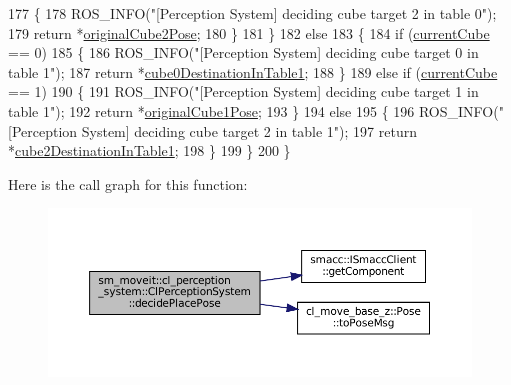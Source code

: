 \begin{DoxyCode}
177             \{
178                 ROS\_INFO(\textcolor{stringliteral}{"[Perception System] deciding cube target 2 in table 0"});
179                 \textcolor{keywordflow}{return} *\hyperlink{classsm__moveit_1_1cl__perception__system_1_1ClPerceptionSystem_a7d8cdfe20da5b47871adf9d3dce11338}{originalCube2Pose};
180             \}
181         \}
182         \textcolor{keywordflow}{else}
183         \{
184             \textcolor{keywordflow}{if} (\hyperlink{classsm__moveit_1_1cl__perception__system_1_1ClPerceptionSystem_a0ffeadfa41480c9d4d0fcc509237dff6}{currentCube} == 0)
185             \{
186                 ROS\_INFO(\textcolor{stringliteral}{"[Perception System] deciding cube target 0 in table 1"});
187                 \textcolor{keywordflow}{return} *\hyperlink{classsm__moveit_1_1cl__perception__system_1_1ClPerceptionSystem_ab84bbc2d5e5a7ef7839a0ade56942679}{cube0DestinationInTable1};
188             \}
189             \textcolor{keywordflow}{else} \textcolor{keywordflow}{if} (\hyperlink{classsm__moveit_1_1cl__perception__system_1_1ClPerceptionSystem_a0ffeadfa41480c9d4d0fcc509237dff6}{currentCube} == 1)
190             \{
191                 ROS\_INFO(\textcolor{stringliteral}{"[Perception System] deciding cube target 1 in table 1"});
192                 \textcolor{keywordflow}{return} *\hyperlink{classsm__moveit_1_1cl__perception__system_1_1ClPerceptionSystem_ab8851b53535efa7e154248c119e8c3cd}{originalCube1Pose};
193             \}
194             \textcolor{keywordflow}{else}
195             \{
196                 ROS\_INFO(\textcolor{stringliteral}{"[Perception System] deciding cube target 2 in table 1"});
197                 \textcolor{keywordflow}{return} *\hyperlink{classsm__moveit_1_1cl__perception__system_1_1ClPerceptionSystem_abb792620853ba381aa0736b884dabe92}{cube2DestinationInTable1};
198             \}
199         \}
200     \}
\end{DoxyCode}
Here is the call graph for this function\+:
\nopagebreak
\begin{figure}[H]
\begin{center}
\leavevmode
\includegraphics[width=350pt]{classsm__moveit_1_1cl__perception__system_1_1ClPerceptionSystem_a354f357ec7bc5438e7eeab2006868261_cgraph}
\end{center}
\end{figure}
